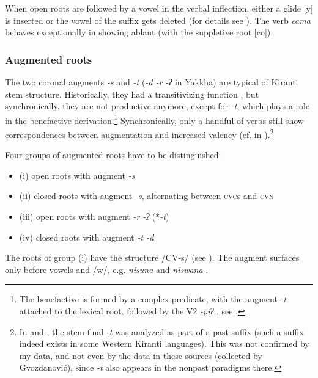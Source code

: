 When open roots are followed by a vowel in the verbal inflection, either a glide [y] is inserted or the vowel of the suffix gets deleted (for details see ). The verb \emph{cama} behaves exceptionally in showing ablaut (with the suppletive root [co]). 

\subsubsection{Augmented roots}

The two coronal augments \emph{-s} and \emph{-t} (\emph{\ti -d \ti -r \ti -ʔ} in Yakkha) are typical of Kiranti stem structure. Historically, they had a transitivizing function \citep{Sprigg1985The-Limbu, Michailovsky1985Tibeto-Burman, Driem1989_Reflexes, Matisoff2003Handbook, Bickel2003Belhare, Bickeletal2007Free}, but synchronically, they are not productive anymore, except for \emph{-t}, which plays a role in the benefactive derivation.\footnote{The benefactive is formed by a complex predicate, with the augment \emph{-t}  attached to the lexical root, followed by the V2 \emph{-piʔ} , see .} Synchronically, only a handful of verbs still show correspondences between augmentation and increased valency (cf.  in ).\footnote{In \citet{Driem1994The-Yakkha} and \citet{Gvozdanovic1987How}, the stem-final \emph{-t} was analyzed as part of a past suffix (such a suffix indeed exists in some Western Kiranti languages). This was not confirmed by my data, and not even by the data in these sources (collected by Gvozdanović), since \emph{-t} also appears in the nonpast paradigms there.} 

Four groups of augmented roots have to be distinguished: 

\begin{itemize}
\item (i) open roots with augment \emph{-s}
\item (ii) closed roots with augment \emph{-s}, alternating between \textsc{cvc}s and \textsc{cvn}
\item (iii)  open roots with augment \emph{-r \ti -ʔ} (*\emph{-t})
\item (iv) closed roots with  augment \emph{-t \ti -d}
\end{itemize}
 

The roots of  group (i) have the structure /CV-s/ (see ). The augment surfaces only before vowels and /w/, e.g. \emph{nisuna}  and \emph{niswana} . 

